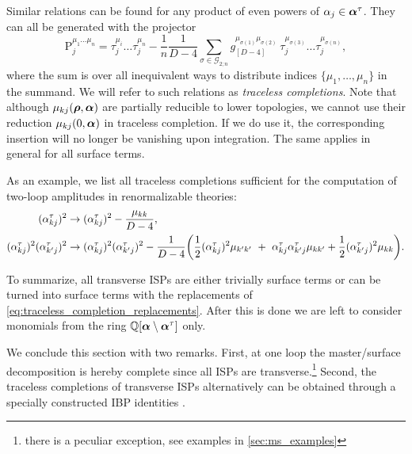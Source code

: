 Similar relations can be found for any product of even powers of $\alpha_j \in \vb*{\alpha}^\tau$.
They can all be generated with the projector  
\begin{equation}
  \mathrm{P}^{\mu_1\ldots{}\mu_n}_j =  \tau^{\mu_i}_j\ldots{}\tau^{\mu_n}_j - \frac{1}{n}\frac{1}{D-4} \sum_{\sigma \in \mathcal{G}_{2;n}}^{} g^{\mu_{\sigma(1)}\mu_{\sigma(2)}}_{[D-4]}~\tau^{\mu_{\sigma(3)}}_j\ldots{}\tau^{\mu_{\sigma(n)}}_j,
\end{equation}
where the sum is over all inequivalent ways to distribute indices $\{\mu_1,\ldots{},\mu_n\}$ in the summand.
We will refer to such relations as \emph{traceless completions}.
Note that although $\mu_{kj}(\vb*{\rho},\vb*{\alpha})$ are partially reducible to lower topologies,
we cannot use their reduction $\mu_{kj}(0,\vb*{\alpha})$ in traceless completion. If we do use it, the
corresponding insertion will no longer be vanishing upon integration.
The same applies in general for all surface terms.

As an example, we list all traceless completions sufficient for the computation of two-loop amplitudes in renormalizable theories:
\begin{align} \label{eq:traceless_completion_replacements}
  (\alpha_{kj}^{\tau})^2 &\to (\alpha_{kj}^{\tau})^2 - \frac{\mu_{kk}}{D-4}, \\
  \nonumber
  (\alpha_{kj}^{\tau})^2(\alpha_{k^\prime j}^{\tau})^2 &\to
  (\alpha_{kj}^{\tau})^2(\alpha_{k^\prime j}^{\tau})^2 - \frac{1}{D-4} \qty(
    \frac{1}{2}(\alpha_{kj}^{\tau})^2 \mu_{k^\prime k^\prime} ~+~ \alpha_{kj}^{\tau}\alpha_{k^\prime j}^{\tau} \mu_{k k^\prime} + \frac{1}{2}(\alpha_{k^\prime j}^{\tau})^2 \mu_{k k}
  ).
\end{align}

To summarize, all transverse ISPs are either trivially surface terms or can be turned into surface terms with the replacements of \cref{eq:traceless_completion_replacements}.
After this is done we are left to consider monomials from the ring $\mathbb{Q}[\vb*{\alpha}\setminus\vb*{\alpha}^\tau]$ only.


We conclude this section with two remarks.
First, at one loop the master/surface decomposition is hereby complete since all ISPs are transverse.\footnote{%
  there is a peculiar exception, see examples in \cref{sec:ms_examples}
}
Second, the traceless completions of transverse ISPs alternatively
can be obtained through a specially constructed IBP identities \cite{Ita:2015tya}.

